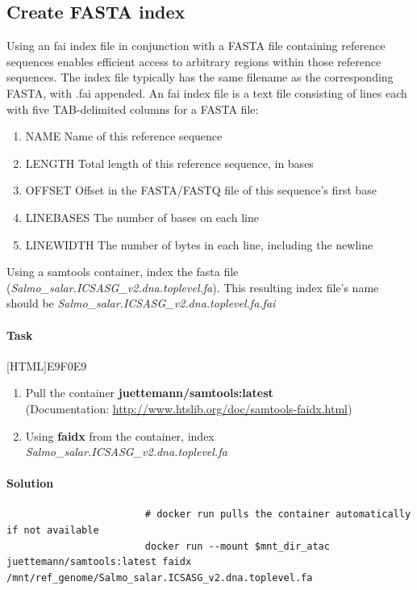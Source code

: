 \documentclass[12pt]{article}
\begin{document}
		
		\subsection{Create FASTA index}
			Using an fai index file in conjunction with a FASTA  file containing reference sequences enables efficient access to arbitrary regions within those reference sequences. 
			The index file typically has the same filename as the corresponding FASTA, with .fai appended.
			An fai index file is a text file consisting of lines each with five TAB-delimited columns for a FASTA file:
			\begin{enumerate}
				\item NAME	Name of this reference sequence
				\item LENGTH	Total length of this reference sequence, in bases
				\item OFFSET	Offset in the FASTA/FASTQ file of this sequence's first base
				\item LINEBASES	The number of bases on each line
				\item LINEWIDTH	The number of bytes in each line, including the newline
			\end{enumerate}
		
			Using a samtools container, index the fasta file (\textit{Salmo\_salar.ICSASG\_v2.dna.toplevel.fa}). 
			This resulting index file's name should be \textit{Salmo\_salar.ICSASG\_v2.dna.toplevel.fa.fai}
		
			\paragraph{Task}
				[HTML]{E9F0E9}{\parbox{\linewidth}{%
						\begin{enumerate}
							\item Pull the container\textbf{ juettemann/samtools:latest} \\
							(Documentation: \url{http://www.htslib.org/doc/samtools-faidx.html})
							\item Using  \textbf{faidx} from the container, index \textit{Salmo\_salar.ICSASG\_v2.dna.toplevel.fa}
						\end{enumerate}
				}}
		
			\paragraph{Solution}
			
				\begin{minipage}{\linewidth}
					\begin{lstlisting}
						# docker run pulls the container automatically if not available
						docker run --mount $mnt_dir_atac juettemann/samtools:latest faidx /mnt/ref_genome/Salmo_salar.ICSASG_v2.dna.toplevel.fa
					\end{lstlisting}
				\end{minipage}
		
\end{document}
